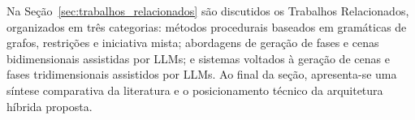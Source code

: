 Na Seção~\ref{sec:trabalhos_relacionados} são discutidos os Trabalhos Relacionados, organizados em três categorias: métodos procedurais baseados em gramáticas de grafos, restrições e iniciativa mista; abordagens de geração de fases e cenas bidimensionais assistidas por LLMs; e sistemas voltados à geração de cenas e fases tridimensionais assistidos por LLMs. Ao final da seção, apresenta-se uma síntese comparativa da literatura e o posicionamento técnico da arquitetura híbrida proposta.